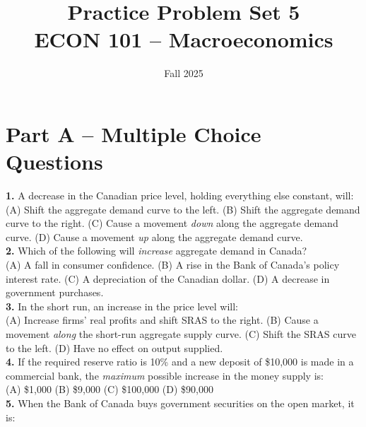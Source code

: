 \documentclass[12pt]{article}
\title{Practice Problem Set 5\\ \vspace{15pt} \large ECON 101 -- Macroeconomics}
\author{}
\date{Fall 2025}
\begin{document}
\maketitle



\section*{Part A – Multiple Choice Questions}

\textbf{1.}  
A decrease in the Canadian price level, holding everything else constant, will:  \\

(A) Shift the aggregate demand curve to the left.  
(B) Shift the aggregate demand curve to the right.  
(C) Cause a movement \emph{down} along the aggregate demand curve.  
(D) Cause a movement \emph{up} along the aggregate demand curve.\\



\textbf{2.}  
Which of the following will \emph{increase} aggregate demand in Canada?  \\

(A) A fall in consumer confidence.  
(B) A rise in the Bank of Canada’s policy interest rate.  
(C) A depreciation of the Canadian dollar.  
(D) A decrease in government purchases.\\



\textbf{3.}  
In the short run, an increase in the price level will:  \\

(A) Increase firms’ real profits and shift SRAS to the right.  
(B) Cause a movement \emph{along} the short-run aggregate supply curve.  
(C) Shift the SRAS curve to the left.  
(D) Have no effect on output supplied.\\



\textbf{4.}  
If the required reserve ratio is 10\% and a new deposit of \$10,000 is made in a commercial bank, the \emph{maximum} possible increase in the money supply is:  \\

(A) \$1,000 \quad (B) \$9,000 \quad (C) \$100,000 \quad (D) \$90,000\\



\textbf{5.}  
When the Bank of Canada buys government securities on the open market, it is:  \\
\end{document}
